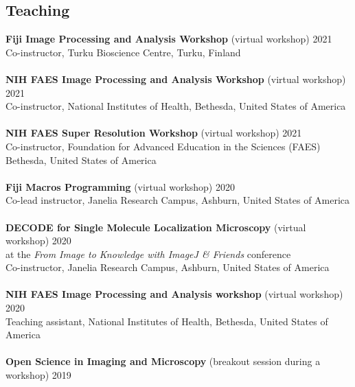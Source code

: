 \documentclass[margin,line]{res}
\begin{document}
\begin{resume}

\section{\sc Teaching}

{\bf  Fiji Image Processing and Analysis Workshop} (virtual workshop)  \hfill 2021\\
Co-instructor, Turku Bioscience Centre, Turku, Finland\\
\vspace*{-3mm}\\
{\bf  NIH FAES Image Processing and Analysis Workshop} (virtual workshop)  \hfill 2021\\
Co-instructor, National Institutes of Health, Bethesda, United States of America\\
\vspace*{-3mm}\\
{\bf  NIH FAES Super Resolution Workshop} (virtual workshop)  \hfill 2021\\
Co-instructor, Foundation for Advanced Education in the Sciences (FAES)\\
Bethesda, United States of America\\
\vspace*{-3mm}\\
{\bf Fiji Macros Programming} (virtual workshop)  \hfill 2020\\
Co-lead instructor, Janelia Research Campus, Ashburn, United States of America\\
\vspace*{-3mm}\\
{\bf DECODE for Single Molecule Localization Microscopy} (virtual workshop)  \hfill 2020\\
at the \emph{From Image to Knowledge with ImageJ \& Friends} conference\\
Co-instructor, Janelia Research Campus, Ashburn, United States of America\\
\vspace*{-3mm}\\
{\bf  NIH FAES Image Processing and Analysis workshop} (virtual workshop)  \hfill 2020\\
 Teaching assistant, National Institutes of Health, Bethesda, United States of America\\
\vspace*{-3mm}\\
{\bf  Open Science in Imaging and Microscopy} (breakout session during a workshop)  \hfill 2019\\

\end{resume}
\end{document}
